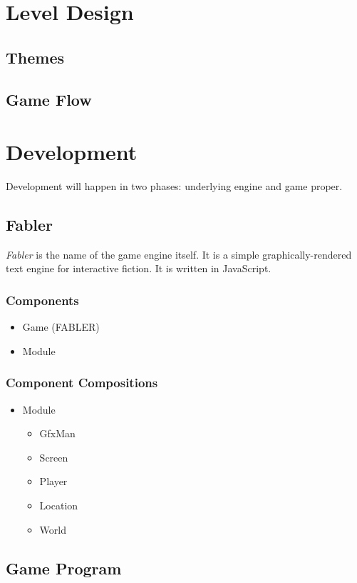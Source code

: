 \documentclass[letterpaper, twoside, 12pt]{memoir}
\begin{document}
\chapter{Level Design}
\section{Themes}
\section{Game Flow}

\chapter{Development}

Development will happen in two phases: underlying engine and game proper.

\section{Fabler}

\textit{Fabler} is the name of the game engine itself. It is a simple graphically-rendered text engine for interactive fiction. It is written in JavaScript.

\subsection{Components}
\begin{itemize}
\item Game (FABLER)
\item Module
\end{itemize}
\subsection{Component Compositions}
\begin{itemize}
\item Module
  \begin{itemize}
  \item GfxMan
  \item Screen
  \item Player
  \item Location
  \item World
  \end{itemize}
\end{itemize}

\section{Game Program}
\end{document}
